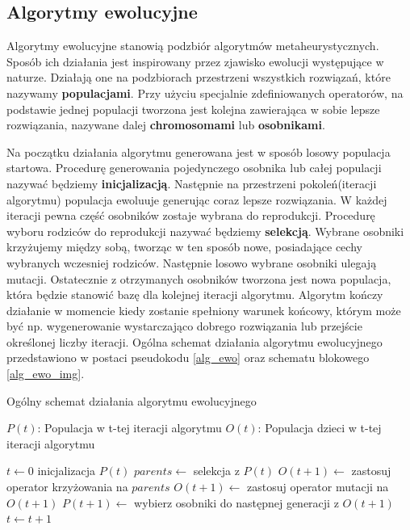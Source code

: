 \subsection{Algorytmy ewolucyjne}
Algorytmy ewolucyjne stanowią podzbiór algorytmów metaheurystycznych. Sposób ich działania jest inspirowany przez zjawisko ewolucji występujące 
w naturze. Działają one na podzbiorach przestrzeni wszystkich rozwiązań, które nazywamy \textbf{populacjami}. Przy użyciu specjalnie zdefiniowanych 
operatorów, na podstawie jednej populacji tworzona jest kolejna zawierająca w sobie lepsze rozwiązania, nazywane dalej \textbf{chromosomami} 
lub \textbf{osobnikami}.

Na początku działania algorytmu generowana jest w sposób losowy populacja startowa. Procedurę generowania pojedynczego osobnika lub 
całej populacji nazywać będziemy \textbf{inicjalizacją}. Następnie na przestrzeni pokoleń(iteracji algorytmu) 
populacja ewoluuje generując coraz lepsze rozwiązania. W każdej iteracji pewna część osobników zostaje wybrana do reprodukcji. Procedurę wyboru 
rodziców do reprodukcji nazywać będziemy \textbf{selekcją}. Wybrane osobniki krzyżujemy między sobą, tworząc w ten sposób nowe, 
posiadające cechy wybranych wczesniej rodziców. Następnie losowo wybrane osobniki ulegają mutacji. 
Ostatecznie z otrzymanych osobników tworzona jest nowa populacja, która będzie stanowić bazę dla kolejnej iteracji algorytmu. Algorytm kończy 
działanie w momencie kiedy zostanie spełniony warunek końcowy, którym może być np. wygenerowanie wystarczająco dobrego rozwiązania lub 
przejście określonej liczby iteracji. Ogólna schemat działania algorytmu ewolucyjnego przedstawiono w postaci pseudokodu \ref{alg_ewo} oraz 
schematu blokowego \ref{alg_ewo_img}.

\begin{pseudokod}[H]
\caption{Ogólny schemat działania algorytmu ewolucyjnego}
\label{alg_ewo}
    $P(t)$: Populacja w t-tej iteracji algorytmu\;
    $O(t)$: Populacja dzieci w t-tej iteracji algorytmu\;

    $t \gets 0$\;
    inicjalizacja $P(t)$\;
     {
        $parents \gets$ selekcja z $P(t)$\;
        $O(t+1) \gets$ zastosuj operator krzyżowania na $parents$\;
        $O(t+1) \gets$ zastosuj operator mutacji na $O(t+1)$\;
        $P(t+1) \gets$ wybierz osobniki do następnej generacji z $O(t+1)$\;
        $t \gets t+1$\;
    }
    \;
\end{pseudokod}

